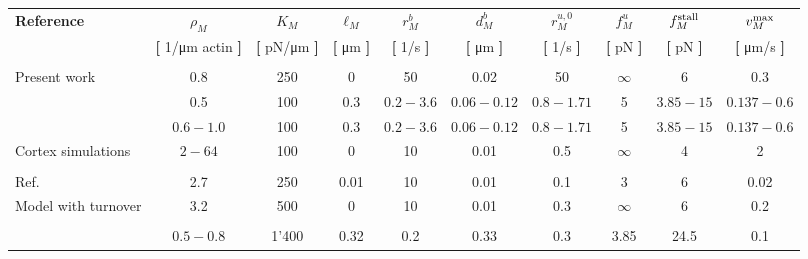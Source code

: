 	\begin{sidewaystable}
	\begin{minipage}[c][\textheight][c]{\textwidth}
		\begin{center}\begin{tabular}{lcccccccccc}
				\multicolumn{2}{l}{\multirow{2}{*}{\textbf{Reference}}} & $\rho_M$ & $K_M$ & $\ell_M$ & $r_M^b$ & $d_M^b$ & $r_M^{u,0}$ & $f_M^u$ & $f_M^{\rm stall}$ & $v_M^{\rm max}$ \\
				
				\multicolumn{2}{l}{}  &  \textbf{[ }\si{1/\micro\meter} actin\textbf{ ]} & \textbf{[ }\si{\pico\newton/\micro\meter}\textbf{ ]} & \textbf{[ }\si{\micro\meter}\textbf{ ]} & \textbf{[ }\si{1/\s}\textbf{ ]} & \textbf{[ }\si{\micro\meter}\textbf{ ]} & \textbf{[ }\si{1/\second}\textbf{ ]} & \textbf{[ }\si{\pico\newton}\textbf{ ]} & \textbf{[ }\si{\pico\newton}\textbf{ ]} & \textbf{[ }\si{\micro\meter/\second}\textbf{ ]} \\ \hline \\
				
				\multicolumn{2}{l}{Present work}  & 0.8 & 250 & 0 & 50 & 0.02 & 50 & $\infty$ & 6 & 0.3 \\
				
				\multirow{2}{*}{\cite{Cortes2020}} &  & 0.5 & 100 & 0.3 & $0.2 - 3.6$ & $0.06 - 0.12$ & $0.8 - 1.71$ & 5 & $3.85 - 15$ & $0.137 - 0.6$ \\
				
				&& $0.6 - 1.0$ & 100 & 0.3 & $0.2 - 3.6$ & $0.06 - 0.12$ & $0.8 - 1.71$ & 5 & $3.85 - 15$ & $0.137 - 0.6$ \\
				
				\multicolumn{2}{l}{Cortex simulations} & $2 - 64$ & 100 & 0 & 10 & 0.01 & 0.5 & $\infty$ & 4 & 2  \\
					
	\multicolumn{2}{l}{ \cite{Wollrab2019}} &  &  &  &  &  &  &  &  &   \\			
				\multicolumn{2}{l}{Ref. \cite{Bun2018}} & 2.7 & 250 & 0.01 & 10 & 0.01 & 0.1 & 3 & 6 & 0.02 \\
				
				\multicolumn{2}{l}{Model with turnover } & 3.2 & 500 & 0 & 10 & 0.01 & 0.3 & $\infty$ & 6 & 0.2 \\
				\multicolumn{2}{l}{\cite{Belmonte2017}} & &  &  &  & & &  &  & \\				
				\multicolumn{2}{l}{\cite{Descovich2017}} & $0.5 - 0.8$ & 1'400 & 0.32 & 0.2 & 0.33 & 0.3 & 3.85 & 24.5 & 0.1 \\
				

\end{tabular}
\end{center}
\end{minipage}
\end{sidewaystable}
